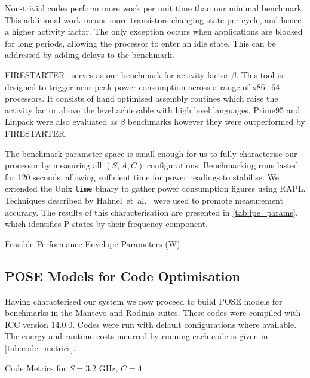 Non-trivial codes perform more work per unit time than our minimal benchmark.
This additional work means more transistors changing state per cycle, and hence a higher activity factor.
The only exception occurs when applications are blocked for long periods, allowing the processor to enter an idle state.
This can be addressed by adding delays to the benchmark.

FIRESTARTER~\cite{hackenberg:2013ab} serves as our benchmark for activity factor $\beta$.
This tool is designed to trigger near-peak power consumption across a range of x86\_64 processors.
It consists of hand optimised assembly routines which raise the activity factor above the level achievable with high level languages.
Prime95 and Linpack were also evaluated as $\beta$ benchmarks however they were outperformed by FIRESTARTER.

The benchmark parameter space is small enough for us to fully characterise our processor by measuring all $(S,A,C)$ configurations.
Benchmarking runs lasted for 120 seconds, allowing sufficient time for power readings to stabilise.
We extended the Unix \texttt{time} binary to gather power consumption figures using RAPL.
Techniques described by Hahnel~et~al.~\cite{hahnel:2012aa} were used to promote measurement accuracy.
The results of this characterisation are presented in \autoref{tab:fpe_params}, which identifies P-states by their frequency component.

\begin{table}
  \scriptsize
  \centering
  \caption{Feasible Performance Envelope Parameters (W)}
  \label{tab:fpe_params}
  
\end{table}

\subsection{POSE Models for Code Optimisation}
\noindent
Having characterised our system we now proceed to build POSE models for benchmarks in the Mantevo and Rodinia suites.
These codes were compiled with ICC version 14.0.0.
Codes were run with default configurations where available.
The energy and runtime costs incurred by running each code is given in \autoref{tab:code_metrics}.

\begin{table}
  \scriptsize
  \centering
  \caption{Code Metrics for $S = 3.2\text{ GHz}$, $C = 4$}
  \label{tab:code_metrics}
  
\end{table}

